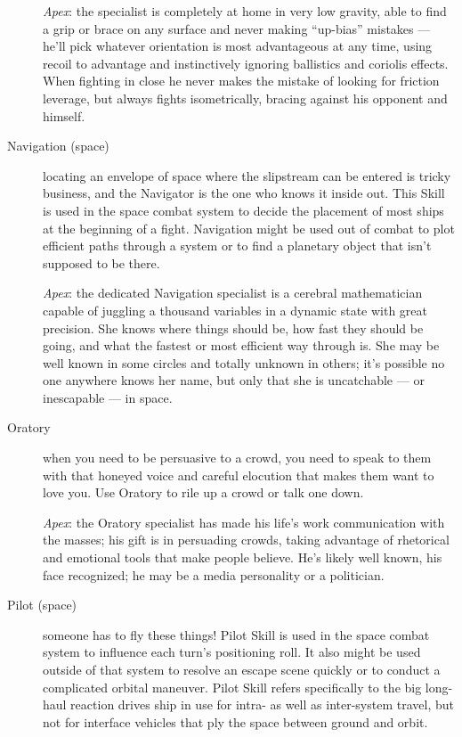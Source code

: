 \begin{description}
\emph{Apex}: the  specialist is completely at home in very low gravity, able to find a grip or brace on any surface and never making ``up-bias'' mistakes --- he'll pick whatever orientation is most advantageous at any time, using recoil to advantage and instinctively ignoring ballistics and coriolis effects. When fighting in close he never makes the mistake of looking for friction leverage, but always fights isometrically, bracing against his opponent and himself.

\item[Navigation (space)]
locating an envelope of space where the slipstream can be entered is tricky business, and the Navigator is the one who knows it inside out. This Skill is used in the space combat system to decide the placement of most ships at the beginning of a fight. Navigation might be used out of combat to plot efficient paths through a system or to find a planetary object that isn't supposed to be there.

\emph{Apex}: the dedicated Navigation specialist is a cerebral mathematician capable of juggling a thousand variables in a dynamic state with great precision. She knows where things should be, how fast they should be going, and what the fastest or most efficient way through is. She may be well known in some circles and totally unknown in others; it's possible no one anywhere knows her name, but only that she is uncatchable --- or inescapable --- in space.

\item[Oratory]
when you need to be persuasive to a crowd, you need to speak to them with that honeyed voice and careful elocution that makes them want to love you. Use Oratory to rile up a crowd or talk one down.

\emph{Apex}: the Oratory specialist has made his life's work communication with the masses; his gift is in persuading crowds, taking advantage of rhetorical and emotional tools that make people believe. He's likely well known, his face recognized; he may be a media personality or a politician.

\item[Pilot (space)]
someone has to fly these things! Pilot Skill is used in the space combat system to influence each turn's positioning roll. It also might be used outside of that system to resolve an escape scene quickly or to conduct a complicated orbital maneuver. Pilot Skill refers specifically to the big long-haul reaction drives ship in use for intra- as well as inter-system travel, but not for interface vehicles that ply the space between ground and orbit.


\end{description}
